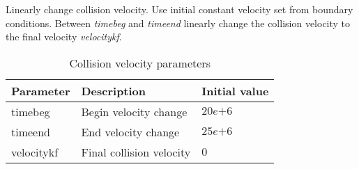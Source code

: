 Linearly change collision velocity. Use initial constant velocity set from boundary conditions. Between \emph{timebeg} and \emph{timeend} linearly change the collision velocity to the final velocity \emph{velocitykf}.

\begin{table}[H]
\small
\centering
\begin{tabular}{l l l}
\toprule
Parameter & Description & Initial value \\
\midrule
timebeg 	& Begin velocity change & $20e{+6}$\\
timeend 	& End velocity change & $25e{+6}$\\
velocitykf 	& Final collision velocity & $0$\\
\bottomrule
\end{tabular}
\caption{Collision velocity parameters}
\label{tbl:mode_collision_parameters}
\end{table}